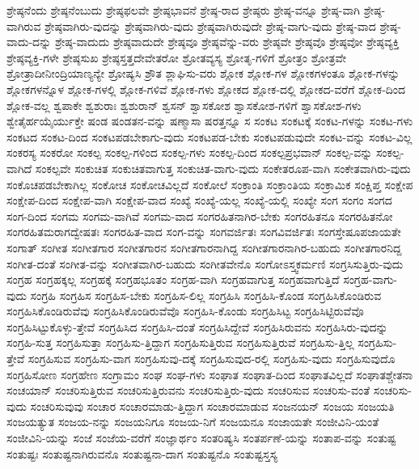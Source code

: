 {ಶ್ರೇಷ್ಠನೆಂದು
ಶ್ರೇಷ್ಠನೆಂಬುದು
ಶ್ರೇಷ್ಠಫಲವೇ
ಶ್ರೇಷ್ಠಭಾವನೆ
ಶ್ರೇಷ್ಠ-ರಾದ
ಶ್ರೇಷ್ಠರು
ಶ್ರೇಷ್ಠ-ವನ್ನೂ
ಶ್ರೇಷ್ಠ-ವಾಗಿ
ಶ್ರೇಷ್ಠ-ವಾಗಿರುವ
ಶ್ರೇಷ್ಠವಾಗಿರು-ವುದನ್ನು
ಶ್ರೇಷ್ಠವಾಗಿರು-ವುದು
ಶ್ರೇಷ್ಠವಾಗಿರುವುದೇ
ಶ್ರೇಷ್ಠ-ವಾಗು-ವುದು
ಶ್ರೇಷ್ಠ-ವಾದ
ಶ್ರೇಷ್ಠ-ವಾದು-ದನ್ನು
ಶ್ರೇಷ್ಠ-ವಾದುದು
ಶ್ರೇಷ್ಠವಾದುದೇ
ಶ್ರೇಷ್ಠವೂ
ಶ್ರೇಷ್ಠವೆನ್ನು-ವರು
ಶ್ರೇಷ್ಠವೇ
ಶ್ರೇಷ್ಠವೊ
ಶ್ರೇಷ್ಠವೋ
ಶ್ರೇಷ್ಠವ್ಯಕ್ತಿ
ಶ್ರೇಷ್ಠವ್ಯಕ್ತಿ-ಗಳೇ
ಶ್ರೇಷ್ಠಸುಖ
ಶ್ರೇಷ್ಠಸ್ತತ್ತದೇವೇತರೋ
ಶ್ರೋತವ್ಯಸ್ಯ
ಶ್ರೋತೃ-ಗಳಿಗೆ
ಶ್ರೋತ್ರಂ
ಶ್ರೋತ್ರವೇ
ಶ್ರೋತ್ರಾದೀನೀಂದ್ರಿಯಾಣ್ಯನ್ಯೇ
ಶ್ರೋಷ್ಯಸಿ
ಶ್ರೌತ
ಶ್ಲಾಘಿಸು-ವರು
ಶ್ಲೋಕ
ಶ್ಲೋಕ-ಗಳ
ಶ್ಲೋಕಗಳಂತೂ
ಶ್ಲೋಕ-ಗಳನ್ನು
ಶ್ಲೋಕಗಳನ್ನೊಳ
ಶ್ಲೋಕ-ಗಳಲ್ಲಿ
ಶ್ಲೋಕ-ಗಳಿವೆ
ಶ್ಲೋಕ-ಗಳು
ಶ್ಲೋಕದ
ಶ್ಲೋಕ-ದಲ್ಲಿ
ಶ್ಲೋಕದ-ವರೆಗೆ
ಶ್ಲೋಕ-ದಿಂದ
ಶ್ಲೋಕ-ವಲ್ಲ
ಶ್ವಪಾಕೇ
ಶ್ವಶುರಾಃ
ಶ್ವಶುರಾನ್
ಶ್ವಸನ್
ಶ್ವಾಸಕೋಶ
ಶ್ವಾಸಕೋಶ-ಗಳಿಗೆ
ಶ್ವಾಸಕೋಶ-ಗಳು
ಶ್ವೇತೈರ್ಹಯೈರ್ಯುಕ್ತೇ
ಷಂಡ
ಷಂಡತನ-ವನ್ನು
ಷಣ್ಮಾಸಾ
ಷರತ್ತನ್ನೂ
ಸ
ಸಂಕಟ
ಸಂಕಟಕ್ಕೆ
ಸಂಕಟ-ಗಳನ್ನು
ಸಂಕಟ-ಗಳು
ಸಂಕಟದ
ಸಂಕಟ-ದಿಂದ
ಸಂಕಟಪಡಬೇಕಾಗು-ವುದು
ಸಂಕಟಪಡ-ಬೇಕು
ಸಂಕಟಪಡುವುದೇ
ಸಂಕಟ-ವನ್ನು
ಸಂಕಟ-ವಿಲ್ಲ
ಸಂಕರಸ್ಯ
ಸಂಕರೋ
ಸಂಕಲ್ಪ
ಸಂಕಲ್ಪ-ಗಳಿಂದ
ಸಂಕಲ್ಪ-ಗಳು
ಸಂಕಲ್ಪ-ದಿಂದ
ಸಂಕಲ್ಪಪ್ರಭವಾನ್
ಸಂಕಲ್ಪ-ವನ್ನು
ಸಂಕಲ್ಪ-ವಾಗಿದೆ
ಸಂಕಲ್ಪವೇ
ಸಂಕುಚಿತ
ಸಂಕುಚಿತವಾಗುತ್ತ
ಸಂಕುಚಿತ-ವಾಗು-ವುದು
ಸಂಕೇತರೂಪ-ವಾಗಿ
ಸಂಕೇತವಾಗಿರು-ವುದು
ಸಂಕೊಚಪಡಬೇಕಾಗಿಲ್ಲ
ಸಂಕೋಚ
ಸಂಕೋಚವಿಲ್ಲದೆ
ಸಂಕೋಲೆ
ಸಂಕ್ರಾಂತಿ
ಸಂಕ್ರಾಂತಿಯ
ಸಂಕ್ರಾಮಿಕ
ಸಂಕ್ಷಿಪ್ತ
ಸಂಕ್ಷೇಪ
ಸಂಕ್ಷೇಪ-ದಿಂದ
ಸಂಕ್ಷೇಪ-ವಾಗಿ
ಸಂಕ್ಷೇಪ-ವಾದ
ಸಂಖ್ಯೆ
ಸಂಖ್ಯೆ-ಯಲ್ಲ
ಸಂಖ್ಯೆ-ಯಲ್ಲಿ
ಸಂಖ್ಯೇ
ಸಂಗ
ಸಂಗಂ
ಸಂಗದ
ಸಂಗ-ದಿಂದ
ಸಂಗಮ
ಸಂಗಮ-ವಾಗಿವೆ
ಸಂಗಮ-ವಾದ
ಸಂಗರಹಿತನಾಗಿರ-ಬೇಕು
ಸಂಗರಹಿತನೂ
ಸಂಗರಹಿತನೋ
ಸಂಗರಹಿತಮರಾಗದ್ವೇಷತಃ
ಸಂಗರಹಿತ-ವಾದ
ಸಂಗ-ವನ್ನು
ಸಂಗವರ್ಜಿತಃ
ಸಂಗವಿವರ್ಜಿತಃ
ಸಂಗಸ್ತೇಷೂಪಜಾಯತೇ
ಸಂಗಾತ್
ಸಂಗೀತ
ಸಂಗೀತಗಾರ
ಸಂಗೀತಗಾರನ
ಸಂಗೀತಗಾರನಾಗಿದ್ದ
ಸಂಗೀತಗಾರನಾಗಿರ-ಬಹುದು
ಸಂಗೀತಗಾರನಿದ್ದ
ಸಂಗೀತ-ದಂತೆ
ಸಂಗೀತ-ವನ್ನು
ಸಂಗೀತವಾಗಿರ-ಬಹುದು
ಸಂಗೀತವೇನೊ
ಸಂಗೋಽಸ್ತ್ವಕರ್ಮಣಿ
ಸಂಗ್ರಸಿಸುತ್ತಿರು-ವುದು
ಸಂಗ್ರಹ
ಸಂಗ್ರಹಕ್ಕಲ್ಲ
ಸಂಗ್ರಹಕ್ಕೆ
ಸಂಗ್ರಹಭೂತಂ
ಸಂಗ್ರಹ-ವಾಗಿ
ಸಂಗ್ರಹವಾಗುತ್ತ
ಸಂಗ್ರಹವಾಗುತ್ತಿದೆ
ಸಂಗ್ರಹ-ವಾಗು-ವುದು
ಸಂಗ್ರಹಿ
ಸಂಗ್ರಹಿಸ
ಸಂಗ್ರಹಿಸ-ಬೇಕು
ಸಂಗ್ರಹಿಸ-ಲಿಲ್ಲ
ಸಂಗ್ರಹಿಸಿ
ಸಂಗ್ರಹಿಸಿ-ಕೊಂಡ
ಸಂಗ್ರಹಿಸಿಕೊಂಡಿರುವ
ಸಂಗ್ರಹಿಸಿಕೊಂಡಿರುವೆವು
ಸಂಗ್ರಹಿಸಿಕೊಂಡಿರುವೆವೊ
ಸಂಗ್ರಹಿಸಿ-ಕೊಂಡು
ಸಂಗ್ರಹಿಸಿಟ್ಟ
ಸಂಗ್ರಹಿಸಿಟ್ಟಿರುವೆವೊ
ಸಂಗ್ರಹಿಸಿಟ್ಟುಕೊಳ್ಳು-ತ್ತೇವೆ
ಸಂಗ್ರಹಿಸಿದ
ಸಂಗ್ರಹಿಸಿ-ದಂತೆ
ಸಂಗ್ರಹಿಸಿದ್ದೇವೆ
ಸಂಗ್ರಹಿಸಿರುವನು
ಸಂಗ್ರಹಿಸಿರು-ವುದನ್ನು
ಸಂಗ್ರಹಿ-ಸುತ್ತ
ಸಂಗ್ರಹಿಸುತ್ತಾ
ಸಂಗ್ರಹಿಸು-ತ್ತಿದ್ದಾಗ
ಸಂಗ್ರಹಿಸುತ್ತಿರುವ
ಸಂಗ್ರಹಿಸುತ್ತಿರುವೆ
ಸಂಗ್ರಹಿಸು-ತ್ತಿಲ್ಲ
ಸಂಗ್ರಹಿಸು-ತ್ತೇವೆ
ಸಂಗ್ರಹಿಸುವ
ಸಂಗ್ರಹಿಸು-ವಾಗ
ಸಂಗ್ರಹಿಸುವು-ದಕ್ಕೆ
ಸಂಗ್ರಹಿಸುವುದ-ರಲ್ಲಿ
ಸಂಗ್ರಹಿಸು-ವುದು
ಸಂಗ್ರಹಿಸುವುದೊ
ಸಂಗ್ರಹಿಸೋಣ
ಸಂಗ್ರಹೇಣ
ಸಂಗ್ರಾಮಂ
ಸಂಘ
ಸಂಘ-ಗಳು
ಸಂಘಾತ
ಸಂಘಾತ-ದಿಂದ
ಸಂಘಾತವಿಲ್ಲದೆ
ಸಂಘಾತಶ್ಚೇತನಾ
ಸಂಚಯಾನ್
ಸಂಚರಿಸುತ್ತಿರುವ
ಸಂಚರಿಸುತ್ತಿರುವನು
ಸಂಚರಿಸುತ್ತಿರು-ವುದು
ಸಂಚರಿಸುವ
ಸಂಚರಿಸು-ವಂತೆ
ಸಂಚರಿಸು-ವುದು
ಸಂಚರಿಸುವುವು
ಸಂಚಾರ
ಸಂಚಾರಮಾಡು-ತ್ತಿದ್ದಾಗ
ಸಂಚಾರಮಾಡುವ
ಸಂಜನಯನ್
ಸಂಜಯ
ಸಂಜಯತಿ
ಸಂಜಯತ್ಯುತ
ಸಂಜಯ-ನನ್ನು
ಸಂಜಯನಿಗೂ
ಸಂಜಯ-ನಿಗೆ
ಸಂಜಯನೂ
ಸಂಜಾಯತೇ
ಸಂಜೀವಿನಿ-ಯಂತೆ
ಸಂಜೀವಿನಿ-ಯನ್ನು
ಸಂಜೆ
ಸಂಜೆಯ-ವರೆಗೆ
ಸಂಜ್ಞಾರ್ಥಂ
ಸಂತರಿಷ್ಯಸಿ
ಸಂತರ್ಪಣೆ-ಯನ್ನು
ಸಂತಾಪ-ವನ್ನು
ಸಂತುಷ್ಟ
ಸಂತುಷ್ಟಃ
ಸಂತುಷ್ಟನಾಗಿರುವನೊ
ಸಂತುಷ್ಟನಾ-ದಾಗ
ಸಂತುಷ್ಟನೊ
ಸಂತುಷ್ಟಸ್ತಸ್ಯ
}

